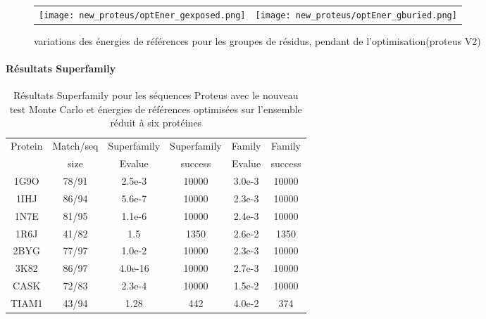    \begin{figure}[t]
     \centering
     \begin{tabular}{cc}
       \texttt{[image: new\_proteus/optEner\_gexposed.png]} &
       \texttt{[image: new\_proteus/optEner\_gburied.png]} \\

     \end{tabular}
     \caption{variations des énergies de références pour les groupes de résidus, pendant de l'optimisation(proteus V2)}
\label{graph:convEref2}
   \end{figure}



    \clearpage
   \paragraph{Résultats Superfamily}


\begin{table}[h]
  \raggedleft{}
  
  \begin{tabular}{cccccc}
    
    \toprule
    Protein & Match/seq & Superfamily & Superfamily & Family & Family \\
            & size      & Evalue      & success     & Evalue & success\\
    \cmidrule{1-6}
    1G9O  & 78/91 & 2.5e-3  & 10000 & 3.0e-3 & 10000 \\
    1IHJ  & 86/94 & 5.6e-7  & 10000 & 2.3e-3 & 10000 \\
    1N7E  & 81/95 & 1.1e-6  & 10000 & 2.4e-3 & 10000 \\
    1R6J  & 41/82 & 1.5     &  1350 & 2.6e-2 &  1350 \\
    2BYG  & 77/97 & 1.0e-2  & 10000 & 2.3e-3 & 10000 \\
    3K82  & 86/97 & 4.0e-16 & 10000 & 2.7e-3 & 10000 \\
    \cmidrule{1-6}
    CASK  & 72/83 & 2.3e-4  & 10000 & 1.5e-2 & 10000 \\
    TIAM1 & 43/94 & 1.28    & 442   & 4.0e-2 & 374 \\
    \bottomrule        
  \end{tabular}   
  \caption{Résultats Superfamily pour les séquences Proteus avec le nouveau test Monte Carlo et énergies de références optimisées sur l'ensemble réduit à six protéines}   
  \label{tab:superfamily}       
\end{table}


